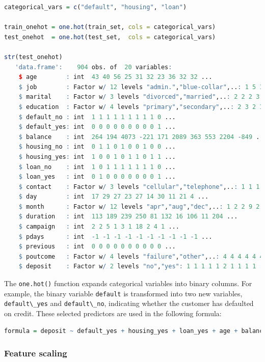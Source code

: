 \documentclass[
]{book}
\newcommand{\passthrough}[1]{#1}
\theoremstyle{definition}
\theoremstyle{definition}
\theoremstyle{definition}
\theoremstyle{definition}
\theoremstyle{remark}
\begin{document}
\begin{lstlisting}[language=R]
categorical_vars = c("default", "housing", "loan")

train_onehot = one.hot(train_set, cols = categorical_vars)
test_onehot  = one.hot(test_set,  cols = categorical_vars)

str(test_onehot)
   'data.frame':    904 obs. of  20 variables:
    $ age        : int  43 40 56 25 31 32 23 36 32 32 ...
    $ job        : Factor w/ 12 levels "admin.","blue-collar",..: 1 5 10 2 10 2 8 5 10 3 ...
    $ marital    : Factor w/ 3 levels "divorced","married",..: 2 2 2 3 2 2 3 3 3 3 ...
    $ education  : Factor w/ 4 levels "primary","secondary",..: 2 3 2 1 2 2 3 3 3 1 ...
    $ default_no : int  1 1 1 1 1 1 1 1 1 0 ...
    $ default_yes: int  0 0 0 0 0 0 0 0 0 1 ...
    $ balance    : int  264 194 4073 -221 171 2089 363 553 2204 -849 ...
    $ housing_no : int  0 1 1 0 1 0 0 1 0 0 ...
    $ housing_yes: int  1 0 0 1 0 1 1 0 1 1 ...
    $ loan_no    : int  1 0 1 1 1 1 1 1 1 0 ...
    $ loan_yes   : int  0 1 0 0 0 0 0 0 0 1 ...
    $ contact    : Factor w/ 3 levels "cellular","telephone",..: 1 1 1 3 1 1 3 1 1 1 ...
    $ day        : int  17 29 27 23 27 14 30 11 21 4 ...
    $ month      : Factor w/ 12 levels "apr","aug","dec",..: 1 2 2 9 2 10 9 2 10 4 ...
    $ duration   : int  113 189 239 250 81 132 16 106 11 204 ...
    $ campaign   : int  2 2 5 1 3 1 18 2 4 1 ...
    $ pdays      : int  -1 -1 -1 -1 -1 -1 -1 -1 -1 -1 ...
    $ previous   : int  0 0 0 0 0 0 0 0 0 0 ...
    $ poutcome   : Factor w/ 4 levels "failure","other",..: 4 4 4 4 4 4 4 4 4 4 ...
    $ deposit    : Factor w/ 2 levels "no","yes": 1 1 1 1 1 2 1 1 1 1 ...
\end{lstlisting}

The \passthrough{\lstinline!one.hot()!} function expands categorical variables into binary columns. For example, the binary variable \passthrough{\lstinline!default!} is transformed into two new variables, \passthrough{\lstinline!default\_yes!} and \passthrough{\lstinline!default\_no!}, indicating whether the customer has defaulted on credit. These selected predictors are used in the following formula:

\begin{lstlisting}[language=R]
formula = deposit ~ default_yes + housing_yes + loan_yes + age + balance + duration + campaign + pdays + previous
\end{lstlisting}

\subsubsection*{Feature scaling}\label{feature-scaling-3}
\end{document}
